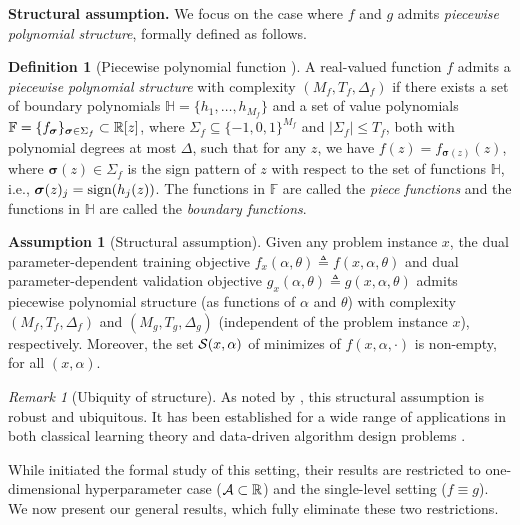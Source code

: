 \documentclass{article}
\theoremstyle{plain}
\theoremstyle{definition}
\newtheorem{definition}[theorem]{Definition}
\newtheorem{assumption}[theorem]{Assumption}
\theoremstyle{remark}
\newtheorem{remark}[theorem]{Remark}
\begin{document}
\textbf{Structural assumption.} We focus on the case where $f$ and $g$ admits \textit{piecewise polynomial structure}, formally defined as follows. 
\begin{definition}[Piecewise polynomial function {\cite{balcan2025sample}}] 
	\label{def:piecewise-poly-def}
	A real-valued function $f$ admits a \textit{piecewise polynomial structure} with complexity $(M_f, T_f, \Delta_f)$ if there exists a set of boundary polynomials $\mathbb{H} = \{h_1, \dots, h_{M_f}\}$ and a set of value polynomials $\mathbb{F} = \{f_{\boldsymbol{\sigma}}\}_{\boldsymbol{\sigma} \in \Sigma_f} \subset \mathbb{R}[z]$, where $\Sigma_f \subseteq \{-1, 0, 1\}^{M_f}$ and $|\Sigma_f| \leq T_f$, both with polynomial degrees at most $\Delta$, such that for any $z$, we have $f(z) = f_{\boldsymbol{\sigma}(z)}(z)$, where $\boldsymbol{\sigma}(z) \in \Sigma_{f}$ is the sign pattern of $z$ with respect to the set of functions $\mathbb{H}$, i.e., $\boldsymbol{\sigma}(z)_j = {\text{sign}}(h_{j}(z))$. The functions in $\mathbb{F}$ are called the \textit{piece functions} and the functions in $\mathbb{H}$ are called the \textit{boundary functions}.
\end{definition}


\begin{assumption}[Structural assumption] \label{asmp:structural}
    Given any problem instance $x$, the dual parameter-dependent training objective $f_{x}(\alpha, \theta) \triangleq f(x, \alpha, \theta)$ and dual parameter-dependent validation objective $g_{x}(\alpha, \theta) \triangleq g(x, \alpha, \theta)$ admits piecewise polynomial structure (as functions of $\alpha$ and $\theta$) with complexity  $(M_f, T_f, \Delta_f)$ and $(M_g, T_g, \Delta_g)$ (independent of the problem instance $x$), respectively. {Moreover, the set $\mathcal{S}(x,\alpha)$ of minimizes of $f(x,\alpha,\cdot)$ is non-empty, for all $(x,\alpha)$.}
\end{assumption}

\begin{remark}[Ubiquity of structure]
    As noted by \citet{balcan2025sample}, this structural assumption is robust and ubiquitous. It has been established for a wide range of applications in both classical learning theory \citep{bartlett1998almost,montufar2014number,bartlett2019nearly} and data-driven algorithm design problems \citep{balcan2021much,balcan2023new,nguyen2026provably,cheng2025generalization}. 
\end{remark}


While \citet{balcan2025sample} initiated the formal study of this setting, their results are restricted to one-dimensional hyperparameter case ($\mathcal{A} \subset \mathbb{R}$) and the single-level setting ($f \equiv g$). We now present our general results, which fully eliminate these two restrictions.
\end{document}
